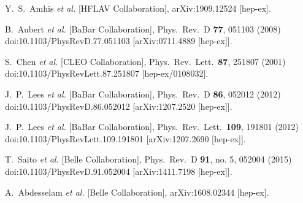\begin{thebibliography}{99}
  Y.~S.~Amhis {\it et al.} [HFLAV Collaboration],
  arXiv:1909.12524 [hep-ex].
  
  B.~Aubert {\it et al.} [BaBar Collaboration],
  Phys.\ Rev.\ D {\bf 77}, 051103 (2008)
  doi:10.1103/PhysRevD.77.051103
  [arXiv:0711.4889 [hep-ex]].
  
  S.~Chen {\it et al.} [CLEO Collaboration],
  Phys.\ Rev.\ Lett.\  {\bf 87}, 251807 (2001)
  doi:10.1103/PhysRevLett.87.251807
  [hep-ex/0108032].
  
  J.~P.~Lees {\it et al.} [BaBar Collaboration],
  Phys.\ Rev.\ D {\bf 86}, 052012 (2012)
  doi:10.1103/PhysRevD.86.052012
  [arXiv:1207.2520 [hep-ex]].
  
  J.~P.~Lees {\it et al.} [BaBar Collaboration],
  Phys.\ Rev.\ Lett.\  {\bf 109}, 191801 (2012)
  doi:10.1103/PhysRevLett.109.191801
  [arXiv:1207.2690 [hep-ex]].
  
  T.~Saito {\it et al.} [Belle Collaboration],
  Phys.\ Rev.\ D {\bf 91}, no. 5, 052004 (2015)
  doi:10.1103/PhysRevD.91.052004
  [arXiv:1411.7198 [hep-ex]].
 
  A.~Abdesselam {\it et al.} [Belle Collaboration],
  arXiv:1608.02344 [hep-ex].
  

\end{thebibliography}
